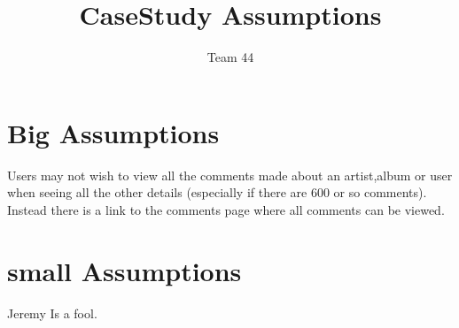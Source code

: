 \documentclass{article}
\title{CaseStudy Assumptions}
\author{Team 44}
\begin{document}
\section{Big Assumptions}
Users may not wish to view all the comments made about an artist,album or user when seeing all the other details (especially if there are 600 or so comments). Instead there is a link to the comments page where all comments can be viewed.

\section{small Assumptions}
Jeremy Is a fool.
\end{document}
